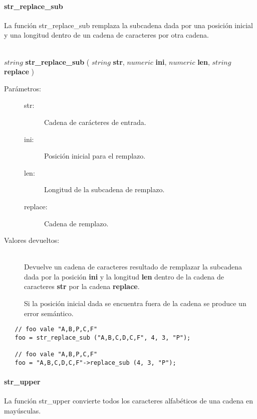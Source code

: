 \paragraph{str\_replace\_sub}
La función str\_replace\_sub remplaza la subcadena dada por una posición inicial y una longitud dentro de un cadena de caracteres por otra cadena.

\begin{framed}
\hfill \\ $string$ \textbf{str\_replace\_sub} ( $string$ \textbf{str}, $numeric$ \textbf{ini}, $numeric$ \textbf{len}, $string$ \textbf{replace} )  
\begin{description}
\item [Parámetros:] \hfill 
   \begin{description}
   \item[str:] Cadena de carácteres de entrada.
   \item[ini:] Posición inicial para el remplazo.
   \item[len:] Longitud de la subcadena de remplazo.
   \item[replace:] Cadena de remplazo.
   \end{description}
\item[Valores devueltos:] \hfill \\
   Devuelve un cadena de caracteres resultado de remplazar la subcadena dada por la posición \textbf{ini} y la longitud
   \textbf{len} dentro de la cadena de caracteres \textbf{str} por la cadena \textbf{replace}.
   
   Si la posición inicial dada se encuentra fuera de la cadena se produce un error semántico.
\end{description}
\end{framed}

\begin{lstlisting}
   // foo vale "A,B,P,C,F" 
   foo = str_replace_sub ("A,B,C,D,C,F", 4, 3, "P"); 
   
   // foo vale "A,B,P,C,F" 
   foo = "A,B,C,D,C,F"->replace_sub (4, 3, "P");
\end{lstlisting}

\paragraph{str\_upper}
La función str\_upper convierte todos los caracteres alfabéticos de una cadena en mayúsculas. 

